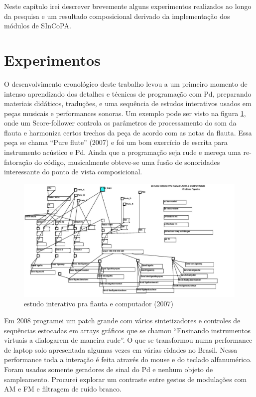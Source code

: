 \documentclass{ppgmus}
\begin{document}
Neste capítulo irei descrever brevemente alguns experimentos realizados
ao longo da pesquisa e um resultado composicional derivado
da implementação dos módulos de SInCoPA.

\section{Experimentos}
\label{experimentos}

O desenvolvimento cronológico deste trabalho levou a um primeiro momento de intenso aprendizado
dos detalhes e técnicas de programação com Pd, preparando materiais didáticos, traduções, e uma
sequência de estudos interativos usados em peças musicais e performances sonoras. Um exemplo pode ser visto
na figura \ref{flauta2007}, onde um Score-follower controla os parâmetros de 
processamento do som da flauta e harmoniza certos trechos da peça de acordo com as notas da flauta.
Essa peça se chama ``Pure flute'' (2007) e foi um bom exercício de escrita para instrumento acústico
e Pd. Ainda que a programação seja rude e mereça uma re-fatoração do código, musicalmente 
obteve-se uma fusão de sonoridades interessante do ponto de vista composicional.

\begin{figure}
\includegraphics[scale=.3]{flauta2007}
\caption{estudo interativo pra flauta e computador (2007)}
\label{flauta2007}
\end{figure} 

Em 2008 programei um patch grande com vários sintetizadores e controles de sequências estocadas
em arrays gráficos que se chamou ``Ensinando instrumentos virtuais a dialogarem de maneira rude''.
O que se transformou numa performance de laptop solo apresentada algumas vezes em várias
cidades no Brasil. Nessa performance toda a interação é feita através do mouse e do 
teclado alfanumérico. Foram usados somente geradores de sinal do Pd e nenhum objeto de sampleamento.
 Procurei explorar um contraste entre gestos de modulações com AM e FM e filtragem de ruído branco.
\end{document}
